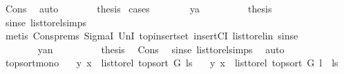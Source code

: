 \begin{isabellebody}
\ Cons\ \isamarkupfalse%
\ auto\isanewline
\ \ \ \ \isamarkupfalse%
\ \isamarkupfalse%
\ {\isacharquery}{\kern0pt}thesis\ \isamarkupfalse%
{\isacharparenleft}{\kern0pt}cases{\isacharparenright}{\kern0pt}\isanewline
\ \ \ \ \ \ \isamarkupfalse%
\ ya\isanewline
\ \ \ \ \ \ \isamarkupfalse%
\ \isamarkupfalse%
\ {\isacharquery}{\kern0pt}thesis\ \isamarkupfalse%
\ sinse\ list{\isacharunderscore}{\kern0pt}to{\isacharunderscore}{\kern0pt}rel{\isachardot}{\kern0pt}simps\isanewline
\ \ \ \ \ \ \ \ \isamarkupfalse%
\ {\isacharparenleft}{\kern0pt}metis\ Cons{\isachardot}{\kern0pt}prems\ SigmaI\ UnI{}\ top{\isacharunderscore}{\kern0pt}insert{\isacharunderscore}{\kern0pt}set\ insertCI\ list{\isacharunderscore}{\kern0pt}to{\isacharunderscore}{\kern0pt}rel{\isacharunderscore}{\kern0pt}in\ sinse{\isacharparenright}{\kern0pt}\ \isanewline
\ \ \ \ \isamarkupfalse%
\isanewline
\ \ \ \ \ \ \isamarkupfalse%
\ yan\isanewline
\ \ \ \ \ \ \isamarkupfalse%
\ \isamarkupfalse%
\ {\isacharquery}{\kern0pt}thesis\ \isamarkupfalse%
\ Cons\ \isamarkupfalse%
\ sinse\ list{\isacharunderscore}{\kern0pt}to{\isacharunderscore}{\kern0pt}rel{\isachardot}{\kern0pt}simps\ \isamarkupfalse%
\ auto\ \isanewline
\ \ \ \ \isamarkupfalse%
\isanewline
\ \ \isamarkupfalse%
\isanewline
{}\isamarkupfalse%
%
\endisatagproof
{\isafoldproof}%
%
\isadelimproof
\isanewline
%
\endisadelimproof
\isanewline
{}\isamarkupfalse%
\ top{\isacharunderscore}{\kern0pt}sort{\isacharunderscore}{\kern0pt}mono{\isacharcolon}{\kern0pt}\isanewline
\ \ \ {\isachardoublequoteopen}{\isacharparenleft}{\kern0pt}y{\isacharcomma}{\kern0pt}\ x{\isacharparenright}{\kern0pt}\ {\isasymin}\ list{\isacharunderscore}{\kern0pt}to{\isacharunderscore}{\kern0pt}rel\ {\isacharparenleft}{\kern0pt}top{\isacharunderscore}{\kern0pt}sort\ G\ ls{\isacharparenright}{\kern0pt}{\isachardoublequoteclose}\isanewline
\ \ \ {\isachardoublequoteopen}{\isacharparenleft}{\kern0pt}y{\isacharcomma}{\kern0pt}\ x{\isacharparenright}{\kern0pt}\ {\isasymin}\ list{\isacharunderscore}{\kern0pt}to{\isacharunderscore}{\kern0pt}rel\ {\isacharparenleft}{\kern0pt}top{\isacharunderscore}{\kern0pt}sort\ G\ {\isacharparenleft}{\kern0pt}l\ {\isacharhash}{\kern0pt}\ ls{\isacharparenright}{\kern0pt}{\isacharparenright}{\kern0pt}{\isachardoublequoteclose}\isanewline

\end{isabellebody}
